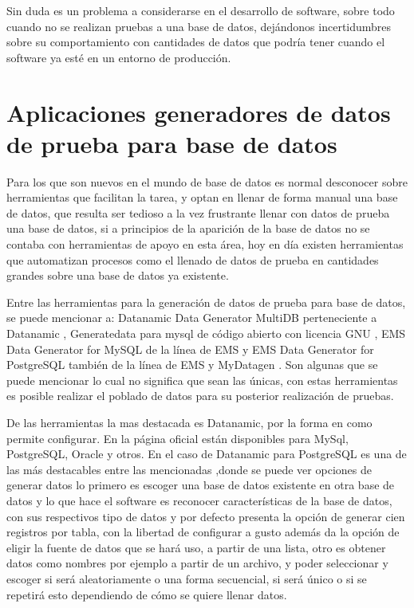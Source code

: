 Sin duda es un problema a considerarse en el desarrollo de software, sobre todo cuando no se realizan pruebas a una base de datos, dej\'andonos incertidumbres sobre su comportamiento con cantidades de datos que podr\'ia tener cuando el software ya est\'e en un entorno de producci\'on.
\section{Aplicaciones generadores de datos de prueba para base de datos}
Para los que son nuevos en el mundo de base de datos es normal desconocer sobre herramientas que facilitan la tarea, y optan en llenar de forma manual una base de datos, que resulta ser tedioso a la vez frustrante llenar con datos de prueba una base de datos, si a principios de la aparici\'on de la base de datos no se contaba con herramientas de apoyo en esta \'area, hoy en d\'ia existen herramientas que automatizan procesos como el llenado de datos de prueba en cantidades grandes sobre una base de datos ya existente. 

Entre las herramientas para la generaci\'on de datos de prueba para base de datos, se puede mencionar a: Datanamic Data Generator MultiDB perteneciente a Datanamic \cite{datanamic}, Generatedata para mysql de c\'odigo abierto con licencia GNU \cite{generatedata}, EMS Data Generator for MySQL de la l\'inea de EMS y EMS Data Generator for PostgreSQL tambi\'en de la l\'inea de EMS \cite{emsdatagenerator} y MyDatagen \cite{mydatagen}. Son algunas que se puede mencionar lo cual no significa que sean las \'unicas, con estas herramientas es posible realizar el poblado de datos para su posterior realizaci\'on de pruebas.

De las herramientas la mas destacada es Datanamic, por la forma en como permite configurar. En la p\'agina oficial \cite{datanamic} est\'an disponibles para MySql, PostgreSQL, Oracle y otros. En el caso de Datanamic para PostgreSQL es una de las  m\'as destacables entre las mencionadas ,donde se puede ver opciones de generar datos lo primero es escoger una base de datos existente en otra base de datos y lo que hace el software es reconocer caracter\'isticas de la base de datos, con sus respectivos tipo de datos y por defecto presenta la opci\'on de generar cien registros por tabla, con la libertad de configurar a gusto adem\'as da la opci\'on de eligir la fuente de datos que se har\'a uso, a partir de una lista, otro es obtener datos como nombres por ejemplo a partir de un archivo, y poder seleccionar y escoger si ser\'a aleatoriamente o una forma secuencial, si ser\'a \'unico o si se repetir\'a esto dependiendo de c\'omo se quiere llenar datos.

